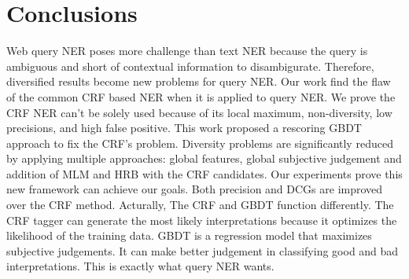 \documentclass[11pt]{article}
\begin{document}
\section{Conclusions}
Web query NER poses more challenge than text NER because the query is ambiguous and short of contextual information to disambigurate. Therefore, diversified results become  new problems for query NER. Our work find the flaw of the common CRF based NER when it is applied to query NER. We prove the CRF NER can't be solely used because of its local maximum, non-diversity, low precisions, and high false positive.    This work proposed a rescoring GBDT approach to fix the CRF's problem. Diversity problems are significantly reduced by applying multiple approaches: global features, global subjective judgement and addition of MLM and HRB with the CRF candidates. Our experiments prove this new framework can achieve our goals. Both precision and DCGs are improved over the CRF method. Acturally, The CRF and GBDT function differently. The CRF tagger can generate the most likely interpretations because it optimizes the likelihood of the training data.   GBDT is a regression model that maximizes subjective judgements. It can make better judgement in classifying good and bad interpretations. This is exactly what query NER wants.






\end{document}
